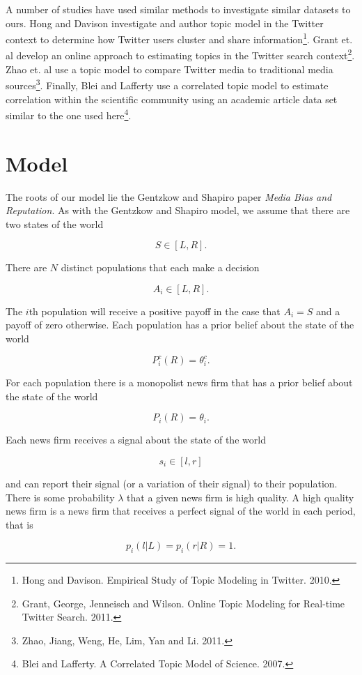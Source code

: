 \documentclass[a4paper]{article}
\begin{document}
A number of studies have used similar methods to investigate similar datasets to ours.  Hong and Davison investigate and author topic model in the Twitter context to determine how Twitter users cluster and share information\footnote{Hong and Davison. Empirical Study of Topic Modeling in Twitter. 2010.}.  Grant et. al develop an online approach to estimating topics in the Twitter search context\footnote{Grant, George, Jenneisch and Wilson. Online Topic Modeling for Real-time Twitter Search. 2011.}.  Zhao et. al use a topic model to compare Twitter media to traditional media sources\footnote{Zhao, Jiang, Weng, He, Lim, Yan and Li. 2011.}.  Finally, Blei and Lafferty use a correlated topic model to estimate correlation within the scientific community using an academic article data set similar to the one used here\footnote{Blei and Lafferty. A Correlated Topic Model of Science. 2007.}.

\section{Model}

The roots of our model lie the Gentzkow and Shapiro paper \emph{Media Bias and Reputation}.  As with the Gentzkow and Shapiro model, we assume that there are two states of the world

\[S \in [L,R].\]

There are $N$ distinct populations that each make a decision

\[A_i \in [L, R].\]

The $i$th population will receive a positive payoff in the case that $A_i = S$ and a payoff of zero otherwise.  Each population has a prior belief about the state of the world

\[P_i^c(R) = \theta_i^c.\]

For each population there is a monopolist news firm that has a prior belief about the state of the world

\[P_i(R) = \theta_i.\]

Each news firm receives a signal about the state of the world

\[s_i \in[l, r]\]

and can report their signal (or a variation of their signal) to their population.  There is some probability $\lambda$ that a given news firm is high quality.  A high quality news firm is a news firm that receives a perfect signal of the world in each period, that is

\[p_i(l|L) = p_i(r|R) =1.\]
\end{document}
